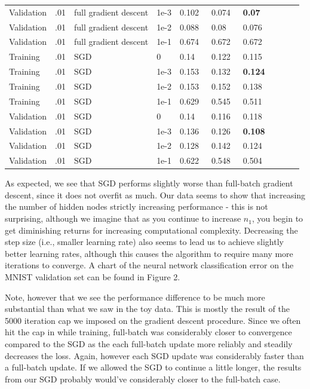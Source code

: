 \documentclass[10pt]{article}
\begin{document}
\begin{table}
\begin{tabular}{llllllllll}
Validation & .01 & full gradient descent & 1e-3 & 0.102 & 0.074 & \bf{0.07}  \\
Validation & .01 & full gradient descent & 1e-2 & 0.088 & 0.08  & 0.076 \\
Validation & .01 & full gradient descent & 1e-1 & 0.674 & 0.672 & 0.672 \\
\midrule
Training &.01 & SGD &  0 & 0.14  & 0.122 & 0.115 \\
Training &.01 & SGD & 1e-3 & 0.153 & 0.132 & \bf{0.124} \\
Training &.01 & SGD & 1e-2 & 0.153 & 0.152 & 0.138 \\
Training &.01 & SGD & 1e-1 & 0.629 & 0.545 & 0.511 \\
\midrule
Validation & .01 & SGD &  0 & 0.14  & 0.116 & 0.118 \\
Validation & .01 & SGD & 1e-3 & 0.136 & 0.126 & \bf{0.108} \\
Validation & .01 & SGD & 1e-2 & 0.128 & 0.142 & 0.124 \\
Validation & .01 & SGD & 1e-1 & 0.622 & 0.548 & 0.504 \\
\bottomrule
\end{tabular}
\end{table}

As expected, we see that SGD performs slightly worse than full-batch gradient descent, since it does not overfit as much. Our data seems to show that increasing the number of hidden nodes strictly increasing performance - this is not surprising, although we imagine that as you continue to increase $n_1$, you begin to get diminishing returns for increasing computational complexity. Decreasing the step size (i.e., smaller learning rate) also seems to lead us to achieve slightly better learning rates, although this causes the algorithm to require many more iterations to converge. A chart of the neural network classification error on the MNIST validation set can be found in Figure 2.

Note, however that we see the performance difference to be much more substantial than what we saw in the toy data. This is mostly the result of the 5000 iteration cap we imposed on the gradient descent procedure. Since we often hit the cap in while training, full-batch was considerably closer to convergence compared to the SGD as the each full-batch update more reliably and steadily decreases the loss. Again, however each SGD update was considerably faster than a full-batch update. If we allowed the SGD to continue a little longer, the results from our SGD probably would've considerably closer to the full-batch case. 
\end{document}
